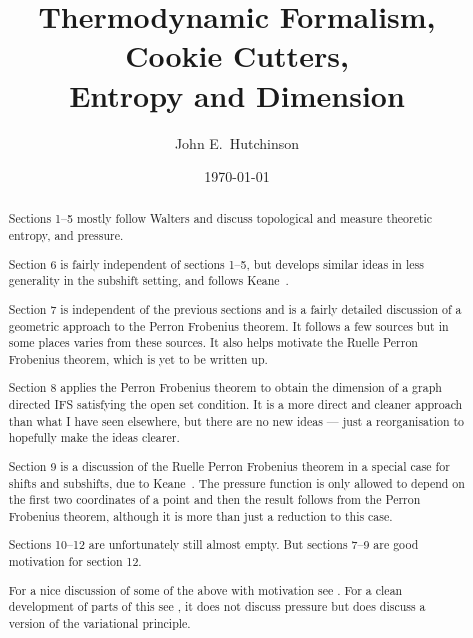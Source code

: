 \documentclass[a4paper]{amsart}
\theoremstyle{plain}
\theoremstyle{definition}
\theoremstyle{remark}
\begin{document}
\title{Thermodynamic Formalism, Cookie Cutters,\\ Entropy and Dimension}  
\author{John E.\ Hutchinson}
\date{\today}

\begin{abstract} 
Sections 1--5 mostly follow Walters \cite{Wal} and  discuss topological and measure theoretic entropy, and pressure.

Section 6 is fairly independent of sections 1--5, but develops similar ideas in  less generality in the subshift setting, and follows Keane~\cite{Kea}.

Section 7 is independent of the previous sections and is a fairly detailed discussion of a geometric approach to the Perron Frobenius theorem.  It follows a few sources but in some places varies from these sources.  It also helps motivate the Ruelle Perron Frobenius theorem, which is yet to be written up.

Section 8 applies the Perron Frobenius theorem to obtain the dimension of a graph directed IFS satisfying the open set condition.  It is a more direct and cleaner approach than what I have seen elsewhere, but there are no new ideas --- just a reorganisation to hopefully make the ideas clearer.  

Section 9 is a discussion of the Ruelle Perron Frobenius theorem in a special case for shifts and subshifts, due to Keane~\cite{Kea}.   The pressure function is only allowed to depend on the first two coordinates of a point and then the result follows from the Perron Frobenius theorem, although it is more than just a reduction to this case. 

Sections 10--12 are unfortunately still almost empty.  But sections 7--9 are  good motivation for section 12.


\bigskip For a nice discussion of some of the above with motivation see \cite{You}.
For a clean development of parts of this see \cite{PY}, it does not discuss pressure but does discuss a version of the variational principle.




\end{abstract}

\maketitle

\tableofcontents


\end{document}
